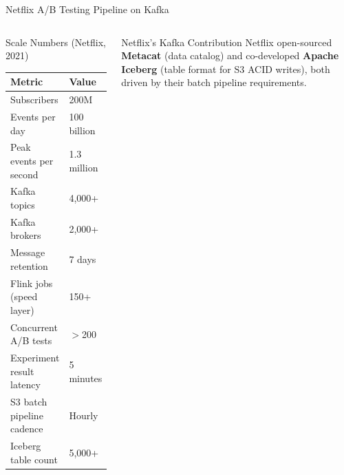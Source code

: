 \documentclass[aspectratio=169,10pt]{beamer}
\begin{document}
\begin{frame}{Netflix A/B Testing Pipeline on Kafka}
\begin{columns}[T]
      \begin{block}{Scale Numbers (Netflix, 2021)}
        \renewcommand{\arraystretch}{1.25}
        \begin{tabular}{@{}ll@{}}
          \toprule
          \textbf{Metric}             & \textbf{Value} \\
          \midrule
          Subscribers                 & 200M \\
          Events per day              & 100 billion \\
          Peak events per second      & 1.3 million \\
          Kafka topics                & 4{,}000+ \\
          Kafka brokers               & 2{,}000+ \\
          Message retention           & 7 days \\
          Flink jobs (speed layer)    & 150+ \\
          Concurrent A/B tests        & $>$200 \\
          Experiment result latency   & 5 minutes \\
          S3 batch pipeline cadence   & Hourly \\
          Iceberg table count         & 5{,}000+ \\
          \bottomrule
        \end{tabular}
      \end{block}
      \vspace{4pt}
      \begin{exampleblock}{Netflix's Kafka Contribution}
        Netflix open-sourced \textbf{Metacat} (data catalog) and
        co-developed \textbf{Apache Iceberg} (table format for S3 ACID
        writes), both driven by their batch pipeline requirements.
      \end{exampleblock}
  \end{columns}
\end{frame}
\end{document}
